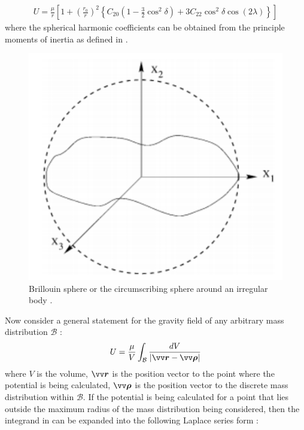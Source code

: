 \begin{align}
    U = \frac{\mu}{r} \left[ 1 + \left(\frac{r_0}{r}\right)^2 \left\{C_{20} \left(1-\frac{3}{2}\cos^2\delta\right) + 3C_{22}\cos^2\delta \cos(2\lambda) \right\} \right]
    \label{eqn:spherical_harmonics_second_degree}
\end{align}
where the spherical harmonic coefficients can be obtained from the principle moments of inertia as defined in \cite{scheeresBook}.
\begin{figure}[htb]
\centering
\captionsetup{justification=centering}
\includegraphics[width=\textwidth, height=0.25\textheight, keepaspectratio=true]{Brillouin_sphere.pdf}
\caption{Brillouin sphere or the circumscribing sphere around an irregular body \parencite{romain2001ellipsoidal}.}
\label{fig:brillouin_sphere}
\end{figure}
\FloatBarrier
Now consider a general statement for the gravity field of any arbitrary mass distribution $\mathcal{B}$ \parencite{scheeresBook}:
\begin{align}
    U = \frac{\mu}{V} \int_{\mathcal{B}} \frac{dV}{|\bvector{r} - \bvector{\rho}|}
    \label{eqn:general_gravity_field}
\end{align}
where $V$ is the volume, $\bvector{r}$ is the position vector to the point where the potential is being calculated, $\bvector{\rho}$ is the position vector to the discrete mass distribution within $\mathcal{B}$. If the potential is being calculated for a point that lies outside the maximum radius of the mass distribution being considered, then the integrand in  can be expanded into the following Laplace series form \parencite{scheeresBook}:
